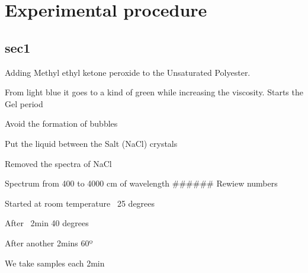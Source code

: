 \chapter{Experimental procedure}

\section{sec1}

Adding Methyl ethyl ketone peroxide to the Unsaturated Polyester.

From light blue it goes to a kind of green while increasing the viscosity.
Starts the Gel period

Avoid the formation of bubbles

Put the liquid between the Salt (NaCl) crystals

Removed the spectra of NaCl

Spectrum from 400 to 4000 cm of wavelength ###### Rewiew numbers

Started at room temperature ~25 degrees

After ~2min 40 degrees

After another 2mins 60º

We take samples each 2min
